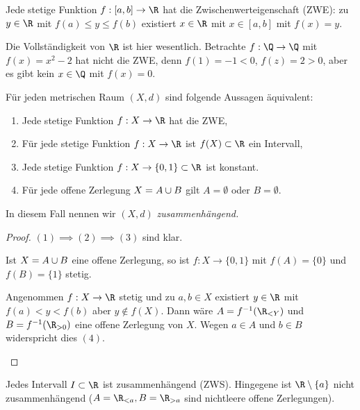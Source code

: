 \begin{st}[Zwischenwertsatz]
	Jede stetige Funktion $f: [a,b] \to \R$ hat die Zwischenwerteigenschaft (ZWE): zu $y \in \R$ mit $f(a) \le y \le f(b)$ existiert $x \in \R$ mit $x \in [a,b]$ mit $f(x) = y$.
	\begin{nt}
		Die Vollständigkeit von $\R$ ist hier wesentlich.
		Betrachte $f: \Q \to \Q$ mit $f(x) = x^2 - 2$ hat nicht die ZWE, denn $f(1) = - 1 < 0$, $f(z) = 2 > 0$, aber es gibt kein $x \in \Q$ mit $f(x) = 0$.
	\end{nt}
\end{st}

\begin{st}
	Für jeden metrischen Raum $(X,d)$ sind folgende Aussagen äquivalent:
	\begin{enumerate}[(1)]
		\item
			Jede stetige Funktion $f: X \to \R$ hat die ZWE,
		\item
			Für jede stetige Funktion $f: X \to \R$ ist $f(X) \subset \R$ ein Intervall,
		\item
			Jede stetige Funktion $f: X \to \{0,1\} \subset \R$ ist konstant.
		\item
			Für jede offene Zerlegung $X = A \cup B$ gilt $A = \emptyset$ oder $B = \emptyset$.
	\end{enumerate}
	In diesem Fall nennen wir $(X,d)$ \em{zusammenhängend}.
	\begin{proof}
		$(1) \implies (2) \implies (3)$ sind klar.
		\begin{seg}[$(3) \implies (4)$]
			Ist $X = A \cup B$ eine offene Zerlegung, so ist \oBdA $f: X \to \{0, 1\}$ mit $f(A) = \{0\}$ und $f(B) = \{1\}$ stetig.
		\end{seg}
		\begin{seg}[$(4) \implies (1)$]
			Angenommen $f: X \to \R$ stetig und zu $a,b \in X$ existiert $y \in \R$ mit $f(a) < y < f(b)$ aber $y \not\in f(X)$.
			Dann wäre $A = f^{-1}(\R_{<Y})$ und $B = f^{-1}(\R_{>0})$ eine offene Zerlegung von $X$.
			Wegen $a \in A$ und $b \in B$ widerspricht dies $(4)$.
		\end{seg}
	\end{proof}
\end{st}

\begin{ex}
	Jedes Intervall $I \subset \R$ ist zusammenhängend (ZWS).
	Hingegene ist $\R \setminus \{a\}$ nicht zusammenhängend ($A = \R_{<a}, B=\R_{>a}$ sind nichtleere offene Zerlegungen).
\end{ex}

